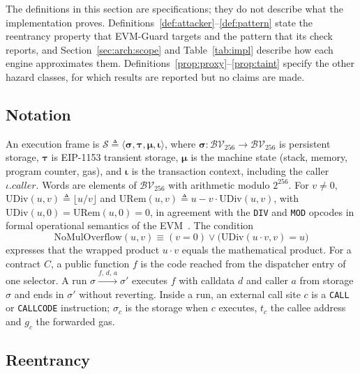 \documentclass[pdflatex,sn-mathphys]{sn-jnl}
\theoremstyle{thmstyletwo}
\theoremstyle{thmstyletwo}
\begin{document}
The definitions in this section are specifications; they do not describe what the implementation proves. Definitions~\ref{def:attacker}--\ref{def:pattern} state the reentrancy property that EVM-Guard targets and the pattern that its check reports, and Section~\ref{sec:arch:scope} and Table~\ref{tab:impl} describe how each engine approximates them. Definitions~\ref{prop:proxy}--\ref{prop:taint} specify the other hazard classes, for which results are reported but no claims are made.

\subsection{Notation}\label{sec:math:state}
An execution frame is $\mathcal{S} \triangleq \langle \mathbf{\sigma}, \mathbf{\tau}, \mathbf{\mu}, \mathbf{\iota} \rangle$, where $\mathbf{\sigma}: \mathcal{BV}_{256} \to \mathcal{BV}_{256}$ is persistent storage, $\mathbf{\tau}$ is EIP-1153 transient storage, $\mathbf{\mu}$ is the machine state (stack, memory, program counter, gas), and $\mathbf{\iota}$ is the transaction context, including the caller $\iota.\mathit{caller}$. Words are elements of $\mathcal{BV}_{256}$ with arithmetic modulo $2^{256}$. For $v \neq 0$, $\mathrm{UDiv}(u, v) \triangleq \lfloor u / v \rfloor$ and $\mathrm{URem}(u, v) \triangleq u - v \cdot \mathrm{UDiv}(u, v)$, with $\mathrm{UDiv}(u, 0) = \mathrm{URem}(u, 0) = 0$, in agreement with the \texttt{DIV} and \texttt{MOD} opcodes in formal operational semantics of the EVM~\cite{grishchenko2018semantic,hildenbrandt2018kevm}. The condition
\begin{equation}
    \mathrm{NoMulOverflow}(u, v) \equiv (v = 0) \lor \big(\mathrm{UDiv}(u \cdot v, v) = u\big)
\end{equation}
expresses that the wrapped product $u \cdot v$ equals the mathematical product. For a contract $C$, a public function $f$ is the code reached from the dispatcher entry of one selector. A run $\sigma \xrightarrow{f,\,d,\,a} \sigma'$ executes $f$ with calldata $d$ and caller $a$ from storage $\sigma$ and ends in $\sigma'$ without reverting. Inside a run, an external call site $c$ is a \texttt{CALL} or \texttt{CALLCODE} instruction; $\sigma_c$ is the storage when $c$ executes, $t_c$ the callee address and $g_c$ the forwarded gas.

\subsection{Reentrancy}\label{sec:math:reentrancy}
\end{document}
